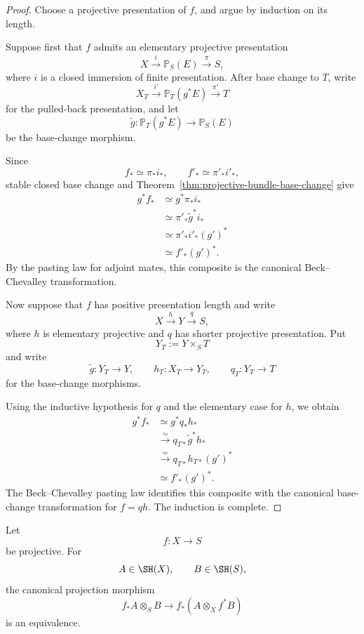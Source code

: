 \begin{proof}
Choose a projective presentation of \(f\), and argue by induction on its
length.

Suppose first that \(f\) admits an elementary projective presentation
\[
    X
    \xrightarrow{i}
    \mathbb P_S(E)
    \xrightarrow{\pi}
    S,
\]
where \(i\) is a closed immersion of finite presentation.  After base change
to \(T\), write
\[
    X_T
    \xrightarrow{i'}
    \mathbb P_T(g^*E)
    \xrightarrow{\pi'}
    T
\]
for the pulled-back presentation, and let
\[
    \widetilde g:
    \mathbb P_T(g^*E)
    \longrightarrow
    \mathbb P_S(E)
\]
be the base-change morphism.

Since
\[
    f_*
    \simeq
    \pi_*i_*,
    \qquad
    f'_*
    \simeq
    \pi'_*i'_*,
\]
stable closed base change and
Theorem~\ref{thm:projective-bundle-base-change} give
\[
\begin{aligned}
    g^*f_*
    &\simeq
    g^*\pi_*i_* \\
    &\simeq
    \pi'_*\widetilde g^*i_* \\
    &\simeq
    \pi'_*i'_*(g')^* \\
    &\simeq
    f'_*(g')^*.
\end{aligned}
\]
By the pasting law for adjoint mates, this composite is the canonical
Beck--Chevalley transformation.

Now suppose that \(f\) has positive presentation length and write
\[
    X\xrightarrow{h}Y\xrightarrow{q}S,
\]
where \(h\) is elementary projective and \(q\) has shorter projective
presentation.  Put
\[
    Y_T:=Y\times_ST
\]
and write
\[
    \widetilde g:Y_T\longrightarrow Y,
    \qquad
    h_T:X_T\longrightarrow Y_T,
    \qquad
    q_T:Y_T\longrightarrow T
\]
for the base-change morphisms.

Using the inductive hypothesis for \(q\) and the elementary case for \(h\),
we obtain
\[
\begin{aligned}
    g^*f_*
    &\simeq
    g^*q_*h_* \\
    &\xrightarrow{\simeq}
    q_{T*}\widetilde g^*h_* \\
    &\xrightarrow{\simeq}
    q_{T*}h_{T*}(g')^* \\
    &\simeq
    f'_*(g')^*.
\end{aligned}
\]
The Beck--Chevalley pasting law identifies this composite with the canonical
base-change transformation for \(f=qh\).  The induction is complete.
\end{proof}

\begin{theorem}
\label{thm:projective-projection-formula}
Let
\[
    f:X\longrightarrow S
\]
be projective.  For
\[
    A\in\SH(X),
    \qquad
    B\in\SH(S),
\]
the canonical projection morphism
\[
    f_*A\otimes_SB
    \longrightarrow
    f_*(A\otimes_Xf^*B)
\]
is an equivalence.
\end{theorem}

